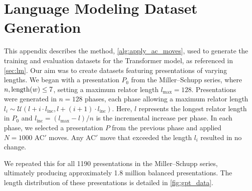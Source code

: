 
\section{Language Modeling Dataset Generation \label{app:algorithm}}

This appendix describes the method, \autoref{alg:apply_ac_moves}, used to generate the training and evaluation datasets for the Transformer model, as referenced in \autoref{sec:lm}. Our aim was to create datasets featuring presentations of varying lengths. We began with a presentation \(P_0\) from the Miller--Schupp series, where \(n, \operatorname{length}(w) \leq 7\), setting a maximum relator length \(l_{\text{max}} = 128\). Presentations were generated in \(n=128\) phases, each phase allowing a maximum relator length \(l_i \sim \mathcal{U}(l + i \cdot l_{\text{inc}}, l + (i+1) \cdot l_{\text{inc}})\). Here, \(l\) represents the longest relator length in \(P_0\) and \(l_{\text{inc}} = (l_{\text{max}} - l)/n\) is the incremental increase per phase. In each phase, we selected a presentation \(P\) from the previous phase and applied \(N=1000\) AC$'$ moves. Any AC$'$ move that exceeded the length \(l_i\) resulted in no change.


We repeated this for all 1190 presentations in the Miller--Schupp series, ultimately producing approximately 1.8 million balanced presentations. The length distribution of these presentations is detailed in \autoref{fig:gpt_data}.

